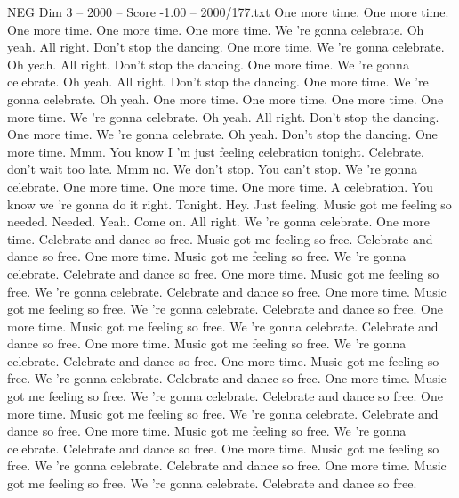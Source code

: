 \begin{textsample}{NEG Dim 3 – 2000 – Score -1.00 – 2000/177.txt}  \label{ex:f3_neg_016}
One more time.
One more time.
One more time.
One more time.
One more time.
We 're gonna celebrate.
Oh yeah.
All right.
Don't stop the dancing.
One more time.
We 're gonna celebrate.
Oh yeah.
All right.
Don't stop the dancing.
One more time.
We 're gonna celebrate.
Oh yeah.
All right.
Don't stop the dancing.
One more time.
We 're gonna celebrate.
Oh yeah.
One more time.
One more time.
One more time.
One more time.
We 're gonna celebrate.
Oh yeah.
All right.
Don't stop the dancing.
One more time.
We 're gonna celebrate.
Oh yeah.
Don't stop the dancing.
One more time.
Mmm.
You know I 'm just feeling celebration tonight.
Celebrate, don't wait too late.
Mmm no.
We don't stop.
You can't stop.
We 're gonna celebrate.
One more time.
One more time.
One more time.
A celebration.
You know we 're gonna do it right.
Tonight.
Hey.
Just feeling.
Music got me feeling so needed.
Needed.
Yeah.
Come on.
All right.
We 're gonna celebrate.
One more time.
Celebrate and dance so free.
Music got me feeling so free.
Celebrate and dance so free.
One more time.
Music got me feeling so free.
We 're gonna celebrate.
Celebrate and dance so free.
One more time.
Music got me feeling so free.
We 're gonna celebrate.
Celebrate and dance so free.
One more time.
Music got me feeling so free.
We 're gonna celebrate.
Celebrate and dance so free.
One more time.
Music got me feeling so free.
We 're gonna celebrate.
Celebrate and dance so free.
One more time.
Music got me feeling so free.
We 're gonna celebrate.
Celebrate and dance so free.
One more time.
Music got me feeling so free.
We 're gonna celebrate.
Celebrate and dance so free.
One more time.
Music got me feeling so free.
We 're gonna celebrate.
Celebrate and dance so free.
One more time.
Music got me feeling so free.
We 're gonna celebrate.
Celebrate and dance so free.
One more time.
Music got me feeling so free.
We 're gonna celebrate.
Celebrate and dance so free.
One more time.
Music got me feeling so free.
We 're gonna celebrate.
Celebrate and dance so free.
One more time.
Music got me feeling so free.
We 're gonna celebrate.
Celebrate and dance so free.

\end{textsample}
